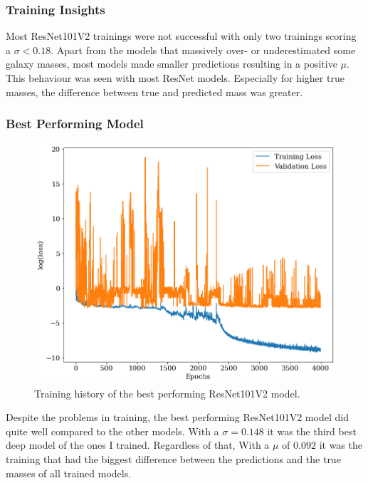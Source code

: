 \subsubsection*{Training Insights}
Most ResNet101V2 trainings were not successful with only two trainings scoring a $\sigma < 0.18$. Apart from the models that massively over- or underestimated some galaxy masses, most models made smaller predictions resulting in a positive $\mu$. This behaviour was seen with most ResNet models. Especially for higher true masses, the difference between true and predicted mass was greater.


\subsubsection*{Best Performing Model}

\begin{figure}[H]
\centering
\includegraphics[width=.667\textwidth]{images/Chapter4/Res101V2/res101v2_history.png}
\caption{Training history of the best performing ResNet101V2 model.} 
\label{fig:resnet101v2_best_history}
\end{figure}

Despite the problems in training, the best performing ResNet101V2 model did quite well compared to the other models. With a $\sigma = 0.148$ it was the third best deep model of the ones I trained. Regardless of that, With a $\mu$ of $0.092$ it was the training that had the biggest difference between the predictions and the true masses of all trained models.


